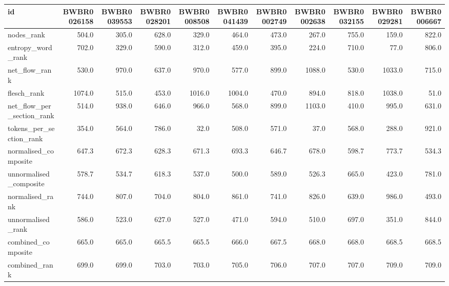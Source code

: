 \begin{tabular}{lrrrrrrrrrr}
\toprule
id & BWBR0026158 & BWBR0039553 & BWBR0028201 & BWBR0008508 & BWBR0041439 & BWBR0002749 & BWBR0002638 & BWBR0032155 & BWBR0029281 & BWBR0006667 \\
\midrule
nodes\_rank & 504.0 & 305.0 & 628.0 & 329.0 & 464.0 & 473.0 & 267.0 & 755.0 & 159.0 & 822.0 \\
\cline{1-11}
entropy\_word\_rank & 702.0 & 329.0 & 590.0 & 312.0 & 459.0 & 395.0 & 224.0 & 710.0 & 77.0 & 806.0 \\
\cline{1-11}
net\_flow\_rank & 530.0 & 970.0 & 637.0 & 970.0 & 577.0 & 899.0 & 1088.0 & 530.0 & 1033.0 & 715.0 \\
\cline{1-11}
flesch\_rank & 1074.0 & 515.0 & 453.0 & 1016.0 & 1004.0 & 470.0 & 894.0 & 818.0 & 1038.0 & 51.0 \\
\cline{1-11}
net\_flow\_per\_section\_rank & 514.0 & 938.0 & 646.0 & 966.0 & 568.0 & 899.0 & 1103.0 & 410.0 & 995.0 & 631.0 \\
\cline{1-11}
tokens\_per\_section\_rank & 354.0 & 564.0 & 786.0 & 32.0 & 508.0 & 571.0 & 37.0 & 568.0 & 288.0 & 921.0 \\
\cline{1-11}
normalised\_composite & 647.3 & 672.3 & 628.3 & 671.3 & 693.3 & 646.7 & 678.0 & 598.7 & 773.7 & 534.3 \\
\cline{1-11}
unnormalised\_composite & 578.7 & 534.7 & 618.3 & 537.0 & 500.0 & 589.0 & 526.3 & 665.0 & 423.0 & 781.0 \\
\cline{1-11}
normalised\_rank & 744.0 & 807.0 & 704.0 & 804.0 & 861.0 & 741.0 & 826.0 & 639.0 & 986.0 & 493.0 \\
\cline{1-11}
unnormalised\_rank & 586.0 & 523.0 & 627.0 & 527.0 & 471.0 & 594.0 & 510.0 & 697.0 & 351.0 & 844.0 \\
\cline{1-11}
combined\_composite & 665.0 & 665.0 & 665.5 & 665.5 & 666.0 & 667.5 & 668.0 & 668.0 & 668.5 & 668.5 \\
\cline{1-11}
combined\_rank & 699.0 & 699.0 & 703.0 & 703.0 & 705.0 & 706.0 & 707.0 & 707.0 & 709.0 & 709.0 \\
\cline{1-11}
\bottomrule
\end{tabular}
